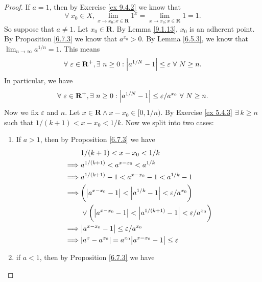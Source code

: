 \begin{proof}
    If \(a = 1\), then by Exercise \ref{ex 9.4.2} we know that
    \[
        \forall\ x_0 \in X, \lim_{x \to x_0 ; x \in \mathbf{R}} 1^x = \lim_{x \to x_0 ; x \in \mathbf{R}} 1 = 1.
    \]
    So suppose that \(a \neq 1\).
    Let \(x_0 \in \mathbf{R}\).
    By Lemma \ref{9.1.13}, \(x_0\) is an adherent point.
    By Proposition \ref{6.7.3} we know that \(a^{x_0} > 0\).
    By Lemma \ref{6.5.3}, we know that \(\lim_{n \to \infty} a^{1 / n} = 1\).
    This means
    \[
        \forall\ \varepsilon \in \mathbf{R}^+, \exists\ n \geq 0 : \abs*{a^{1 / N} - 1} \leq \varepsilon \ \forall\ N \geq n.
    \]
    In particular, we have
    \[
        \forall\ \varepsilon \in \mathbf{R}^+, \exists\ n \geq 0 : \abs*{a^{1 / N} - 1} \leq \varepsilon / a^{x_0} \ \forall\ N \geq n.
    \]
    Now we fix \(\varepsilon\) and \(n\).
    Let \(x \in \mathbf{R} \land x - x_0 \in [0, 1 / n)\).
    By Exercise \ref{ex 5.4.3} \(\exists\ k \geq n\) such that \(1 / (k + 1) < x - x_0 < 1 / k\).
    Now we split into two cases:
    \begin{enumerate}
        \item If \(a > 1\), then by Proposition \ref{6.7.3} we have
              \begin{align*}
                           & 1 / (k + 1) < x - x_0 < 1 / k                                                                \\
                  \implies & a^{1 / (k + 1)} < a^{x - x_0} < a^{1 / k}                                                    \\
                  \implies & a^{1 / (k + 1)} - 1 < a^{x - x_0} - 1 < a^{1 / k} - 1                                        \\
                  \implies & \bigg(\abs*{a^{x - x_0} - 1} < \abs*{a^{1 / k} - 1} < \varepsilon / a^{x_0}\bigg)            \\
                           & \lor \bigg(\abs*{a^{x - x_0} - 1} < \abs*{a^{1 / (k + 1)} - 1} < \varepsilon / a^{x_0}\bigg) \\
                  \implies & \abs*{a^{x - x_0} - 1} \leq \varepsilon / a^{x_0}                                            \\
                  \implies & \abs*{a^x - a^{x_0}} = a^{x_0} \abs*{a^{x - x_0} - 1} \leq \varepsilon                       \\
              \end{align*}
        \item if \(a < 1\), then by Proposition \ref{6.7.3} we have

\end{enumerate}
\end{proof}
